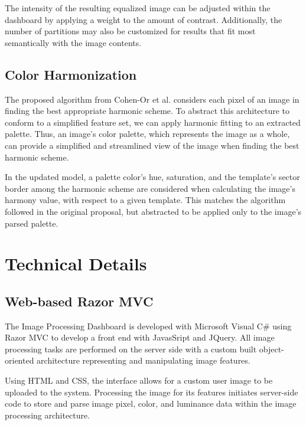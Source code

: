\documentclass[sigchi]{acmart}
\begin{document}
The intensity of the resulting equalized image can be adjusted within the dashboard by applying a weight to the amount of contrast. Additionally, the number of partitions may also be customized for results that fit most semantically with the image contents.


\subsection{Color Harmonization}

The proposed algorithm from Cohen-Or et al. considers each pixel of an image in finding the best appropriate harmonic scheme. To abstract this architecture to conform to a simplified feature set, we can apply harmonic fitting to an extracted palette. Thus, an image's color palette, which represents the image as a whole, can provide a simplified and streamlined view of the image when finding the best harmonic scheme.

In the updated model, a palette color's hue, saturation, and the template's sector border among the harmonic scheme are considered when calculating the image's harmony value, with respect to a given template. This matches the algorithm followed in the original proposal, but abstracted to be applied only to the image's parsed palette.



\section{Technical Details}

\subsection{Web-based Razor MVC}

The Image Processing Dashboard is developed with Microsoft Visual C\# using Razor MVC to develop a front end with JavasSript and JQuery. All image processing tasks are performed on the server side with a custom built object-oriented architecture representing and manipulating image features.

Using HTML and CSS, the interface allows for a custom user image to be uploaded to the system. Processing the image for its features initiates server-side code to store and parse image pixel, color, and luminance data within the image processing architecture. 
\end{document}
